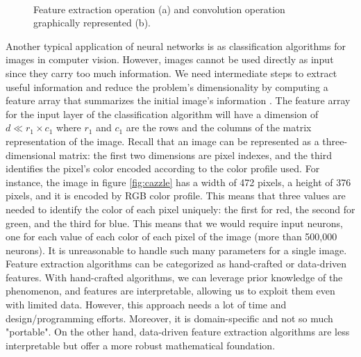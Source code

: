 \begin{figure}
    \centering
    \\
    \caption[Convolution operation.]{Feature extraction operation (a) and convolution operation graphically represented (b)\cite{giacomo_boracchi_convolutional_2021}.}
\end{figure}
Another typical application of neural networks is as classification algorithms for images in computer vision. However, images cannot be used directly as input since they carry too much information. We need intermediate steps to extract useful information and reduce the problem's dimensionality by computing a feature array that summarizes the initial image's information \cite{giacomo_boracchi_convolutional_2021}. The feature array for the input layer of the classification algorithm will have a dimension of $d\ll r_1 \times c_1$ where $r_1$ and $c_1$ are the rows and the columns of the matrix representation of the image. Recall that an image can be represented as a three-dimensional matrix: the first two dimensions are pixel indexes, and the third identifies the pixel's color encoded according to the color profile used. For instance, the image in figure \ref{fig:cazzle} has a width of 472 pixels, a height of 376 pixels, and it is encoded by RGB color profile. This means that three values are needed to identify the color of each pixel uniquely: the first for red, the second for green, and the third for blue. This means that we would require  input neurons, one for each value of each color of each pixel of the image (more than 500,000 neurons). It is unreasonable to handle such many parameters for a single image. Feature extraction algorithms can be categorized as hand-crafted or data-driven features. With hand-crafted algorithms, we can leverage prior knowledge of the phenomenon, and features are interpretable, allowing us to exploit them even with limited data. However, this approach needs a lot of time and design/programming efforts. Moreover, it is domain-specific and not so much "portable". On the other hand, data-driven feature extraction algorithms are less interpretable but offer a more robust mathematical foundation. 
